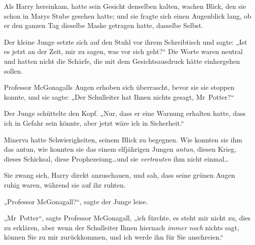 Als Harry hereinkam, hatte sein Gesicht denselben kalten, wachen Blick, den sie schon in Marys Stube gesehen hatte; und sie fragte sich einen Augenblick lang, ob er den ganzen Tag dieselbe Maske getragen hatte, dasselbe Selbst.

Der kleine Junge setzte sich auf den Stuhl vor ihrem Schreibtisch und sagte: „Ist es jetzt an der Zeit, mir zu sagen, was vor sich geht?“ Die Worte waren neutral und hatten nicht die Schärfe, die mit dem Gesichtsausdruck hätte einhergehen sollen.

Professor McGonagalls Augen erhoben sich überrascht, bevor sie sie stoppen konnte, und sie sagte: „Der Schulleiter hat Ihnen nichts gesagt, Mr~Potter?“

Der Junge schüttelte den Kopf. „Nur, dass er eine Warnung erhalten hatte, dass ich in Gefahr sein könnte, aber jetzt wäre ich in Sicherheit.“

Minerva hatte Schwierigkeiten, seinem Blick zu begegnen. Wie konnten sie ihm das antun, wie konnten sie das einem elfjährigen Jungen \emph{antun}, diesen Krieg, dieses Schicksal, diese Prophezeiung…und sie \emph{vertrauten} ihm nicht einmal…

Sie zwang sich, Harry direkt anzuschauen, und sah, dass seine grünen Augen ruhig waren, während sie auf ihr ruhten.

„Professor McGonagall?“, sagte der Junge leise.

„Mr~Potter“, sagte Professor McGonagall, „ich fürchte, es steht mir nicht zu, dies zu erklären, aber wenn der Schulleiter Ihnen hiernach \emph{immer} \emph{noch} nichts sagt, können Sie zu mir zurückkommen, und ich werde ihn für Sie anschreien.“

